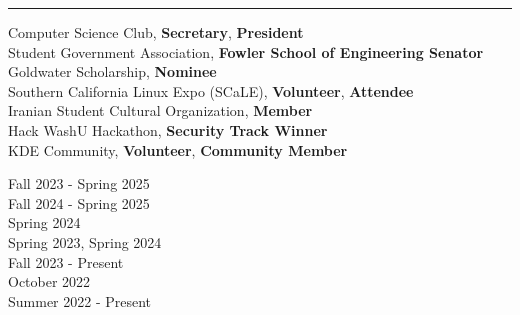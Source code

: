\documentclass[letter]{article}
\begin{document}
    \medskip
    \vspace{4pt}
    \hrule height 1pt
    \vspace{4pt}
    \noindent
    \begin{minipage}[c]{0.7\linewidth}
        \noindent Computer Science Club, \textbf{Secretary}, \textbf{President} \\
        \noindent Student Government Association, \textbf{Fowler School of Engineering Senator} \\
        \noindent Goldwater Scholarship, \textbf{Nominee} \\
        \noindent Southern California Linux Expo (SCaLE), \textbf{Volunteer}, \textbf{Attendee} \\
        \noindent Iranian Student Cultural Organization, \textbf{Member} \\
        \noindent Hack WashU Hackathon, \textbf{Security Track Winner} \\
        \noindent KDE Community, \textbf{Volunteer}, \textbf{Community Member} \\
    \end{minipage}
    \begin{minipage}[c]{0.29\linewidth}
        \vspace*{-\baselineskip}
        \begin{flushright}
            \noindent Fall 2023 - Spring 2025 \\
            \noindent Fall 2024 - Spring 2025 \\
            \noindent Spring 2024 \\
            \noindent Spring 2023, Spring 2024 \\
            \noindent Fall 2023 - Present \\
            \noindent October 2022 \\
            \noindent Summer 2022 - Present \\
        \end{flushright}
    \end{minipage}
\end{document}
